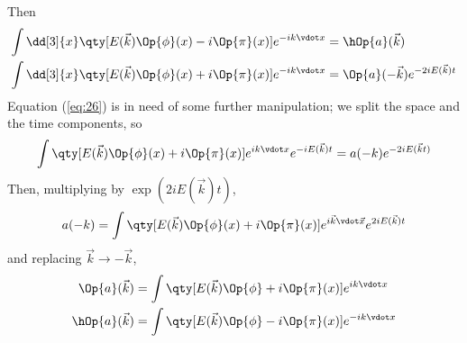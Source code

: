 \documentclass[ebook, openany, oldfontcommands,twocolumn, 10pt]{momento}
\begin{document}
\begin{expl}
\begin{derivation}
Then
\begin{subequations}
\begin{align}
\label{eq:25}
  \int \dd[3]{x} \qty[ E(\vec{k}) \Op{\phi}(x) - i \Op{\pi}(x) ]
                 e^{-i k \vdot x} &= \hOp{a}(\vec{k}) \\
\label{eq:26}
  \int \dd[3]{x} \qty[ E(\vec{k}) \Op{\phi}(x) + i \Op{\pi}(x) ]
                 e^{-i k \vdot x} &= \Op{a}(-\vec{k}) e^{-2 i E(\vec{k}) t}
\end{align}
\end{subequations}
Equation (\ref{eq:26}) is in need of some further manipulation; we
split the space and the time components, so
\begin{equation*}
  \int \qty[ E(\vec{k}) \Op{\phi}(x) + i \Op{\pi}(x)] e^{i k \vdot x} e^{-i E(\vec{k}) t} = a(-k) e^{-2i E(\vec{k} t)} 
\end{equation*}
Then, multiplying by $\exp(2 i E(\vec{k}) t)$,
\[ 
  a(-k) = \int \qty[ E(\vec{k}) \Op{\phi}(x) + i \Op{\pi}(x)] e^{i \vec{k} \vdot \vec{x}} e^{2 i E(\vec{k}) t}
\]
and replacing $\vec{k} \to - \vec{k}$,
\begin{subequations}
  \begin{align}
   \label{eq:28}
    \Op{a}(\vec{k}) &= \int \qty[ E(\vec{k}) \Op{\phi} + i \Op{\pi}(x) ] e^{i k \vdot x} \\
   \label{eq:29}
    \hOp{a}(\vec{k}) &= \int \qty[E(\vec{k}) \Op{\phi} - i \Op{\pi}(x) ] e^{-i k \vdot x}
  \end{align}
\end{subequations}

\end{derivation}



\end{expl}
\end{document}

